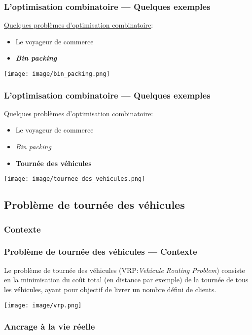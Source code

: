 \documentclass[10pt]{beamer}
\begin{document}
	\begin{frame}
		\frametitle{L'optimisation combinatoire — Quelques exemples}
		\underline{Quelques problèmes d'optimisation combinatoire}:
		\begin{itemize}[label=—]
			\item Le voyageur de commerce
			\item \textbf{\textit{Bin packing}}
		\end{itemize}
		\begin{center}
			\texttt{[image: image/bin\_packing.png]}
		\end{center}
	\end{frame}

	\begin{frame}
		\frametitle{L'optimisation combinatoire — Quelques exemples}
		\underline{Quelques problèmes d'optimisation combinatoire}:
		\begin{itemize}[label=—]
			\item Le voyageur de commerce
			\item \textit{Bin packing}
			\item \textbf{Tournée des véhicules}
		\end{itemize}
		\begin{center}
			\texttt{[image: image/tournee\_des\_vehicules.png]}
		\end{center}
	\end{frame}

	\subsection{Problème de tournée des véhicules}

	\subsubsection{Contexte}
	
	\begin{frame}
		\frametitle{Problème de tournée des véhicules — Contexte}
		Le problème de tournée des véhicules (VRP:\textit{Vehicule Routing Problem}) consiste en la minimisation du coût total (en distance par exemple) de la tournée de tous les véhicules, ayant pour objectif de livrer un nombre défini de clients.
		\begin{center}
			\texttt{[image: image/vrp.png]}
		\end{center}
	\end{frame}

	\subsubsection{Ancrage à la vie réelle}
\end{document}
